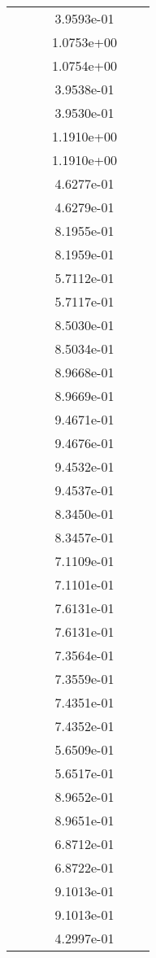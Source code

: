 \begin{xltabular}{\textwidth}{r|rS[table-format=1.3e+2]S[table-format=1.4e+2]S[table-format=1.4e+2]S[table-format=-1.5]}
&  &  & 3.9593e-01 & & \\
&  &  & 1.0753e+00 & & \\
&  &  & 1.0754e+00 & & \\
&  &  & 3.9538e-01 & & \\
&  &  & 3.9530e-01 & & \\
&  &  & 1.1910e+00 & & \\
&  &  & 1.1910e+00 & & \\
&  &  & 4.6277e-01 & & \\
&  &  & 4.6279e-01 & & \\
&  &  & 8.1955e-01 & & \\
&  &  & 8.1959e-01 & & \\
&  &  & 5.7112e-01 & & \\
&  &  & 5.7117e-01 & & \\
&  &  & 8.5030e-01 & & \\
&  &  & 8.5034e-01 & & \\
&  &  & 8.9668e-01 & & \\
&  &  & 8.9669e-01 & & \\
&  &  & 9.4671e-01 & & \\
&  &  & 9.4676e-01 & & \\
&  &  & 9.4532e-01 & & \\
&  &  & 9.4537e-01 & & \\
&  &  & 8.3450e-01 & & \\
&  &  & 8.3457e-01 & & \\
&  &  & 7.1109e-01 & & \\
&  &  & 7.1101e-01 & & \\
&  &  & 7.6131e-01 & & \\
&  &  & 7.6131e-01 & & \\
&  &  & 7.3564e-01 & & \\
&  &  & 7.3559e-01 & & \\
&  &  & 7.4351e-01 & & \\
&  &  & 7.4352e-01 & & \\
&  &  & 5.6509e-01 & & \\
&  &  & 5.6517e-01 & & \\
&  &  & 8.9652e-01 & & \\
&  &  & 8.9651e-01 & & \\
&  &  & 6.8712e-01 & & \\
&  &  & 6.8722e-01 & & \\
&  &  & 9.1013e-01 & & \\
&  &  & 9.1013e-01 & & \\
&  &  & 4.2997e-01 & & \\

\end{xltabular}
